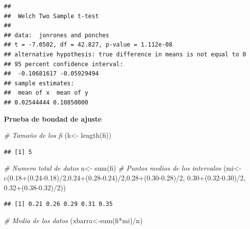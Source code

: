 \documentclass{staprojteamusb}
\newenvironment{Shaded}{\begin{snugshade}}{\end{snugshade}}
\newcommand{\CommentTok}[1]{\textcolor[rgb]{0.56,0.35,0.01}{\textit{#1}}}
\newcommand{\DecValTok}[1]{\textcolor[rgb]{0.00,0.00,0.81}{#1}}
\newcommand{\FloatTok}[1]{\textcolor[rgb]{0.00,0.00,0.81}{#1}}
\newcommand{\FunctionTok}[1]{\textcolor[rgb]{0.00,0.00,0.00}{#1}}
\newcommand{\NormalTok}[1]{#1}
\newcommand{\OtherTok}[1]{\textcolor[rgb]{0.56,0.35,0.01}{#1}}
\newcommand{\SpecialCharTok}[1]{\textcolor[rgb]{0.00,0.00,0.00}{#1}}
\begin{document}
\begin{verbatim}
## 
##  Welch Two Sample t-test
## 
## data:  jonrones and ponches
## t = -7.0502, df = 42.827, p-value = 1.112e-08
## alternative hypothesis: true difference in means is not equal to 0
## 95 percent confidence interval:
##  -0.10681617 -0.05929494
## sample estimates:
##  mean of x  mean of y 
## 0.02544444 0.10850000
\end{verbatim}

 \textbf{Prueba de bondad de ajuste}

\begin{Shaded}
\begin{Highlighting}[]
\CommentTok{\# Tamaño de los fi}
\NormalTok{(k}\OtherTok{\textless{}{-}} \FunctionTok{length}\NormalTok{(fi))}
\end{Highlighting}
\end{Shaded}

\begin{verbatim}
## [1] 5
\end{verbatim}

\begin{Shaded}
\begin{Highlighting}[]
\CommentTok{\# Numero total de datos }
\NormalTok{n}\OtherTok{\textless{}{-}} \FunctionTok{sum}\NormalTok{(fi)}
\CommentTok{\# Puntos medios de los intervalos}
\NormalTok{(mi}\OtherTok{\textless{}{-}}\FunctionTok{c}\NormalTok{(}\FloatTok{0.18}\SpecialCharTok{+}\NormalTok{(}\FloatTok{0.24{-}0.18}\NormalTok{)}\SpecialCharTok{/}\DecValTok{2}\NormalTok{,}\FloatTok{0.24}\SpecialCharTok{+}\NormalTok{(}\FloatTok{0.28{-}0.24}\NormalTok{)}\SpecialCharTok{/}\DecValTok{2}\NormalTok{,}\FloatTok{0.28}\SpecialCharTok{+}\NormalTok{(}\FloatTok{0.30{-}0.28}\NormalTok{)}\SpecialCharTok{/}\DecValTok{2}\NormalTok{,}
       \FloatTok{0.30}\SpecialCharTok{+}\NormalTok{(}\FloatTok{0.32{-}0.30}\NormalTok{)}\SpecialCharTok{/}\DecValTok{2}\NormalTok{, }\FloatTok{0.32}\SpecialCharTok{+}\NormalTok{(}\FloatTok{0.38{-}0.32}\NormalTok{)}\SpecialCharTok{/}\DecValTok{2}\NormalTok{))}
\end{Highlighting}
\end{Shaded}

\begin{verbatim}
## [1] 0.21 0.26 0.29 0.31 0.35
\end{verbatim}

\begin{Shaded}
\begin{Highlighting}[]
\CommentTok{\# Media de los datos}
\NormalTok{(xbarra}\OtherTok{\textless{}{-}}\FunctionTok{sum}\NormalTok{(fi}\SpecialCharTok{*}\NormalTok{mi)}\SpecialCharTok{/}\NormalTok{n)}
\end{Highlighting}
\end{Shaded}
\end{document}

